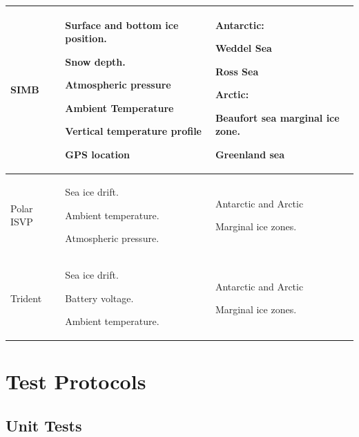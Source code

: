 \begin{center}
{\begin{longtable}[H]{|>{\RaggedRight}m{}|>{\RaggedRight}m{}|>{\RaggedRight}m{}|}
    SIMB    & Surface and bottom ice position. \par Snow depth. \par Atmospheric pressure \par Ambient Temperature \par Vertical temperature profile \par  GPS location & Antarctic: \par Weddel Sea \cite{hoppmann2015fmot} \par Ross Sea \cite{ackley_2020_seaice} \par \vspace{1.5mm}Arctic: \par Beaufort sea marginal ice zone. \par Greenland sea \cite{lei2018seasonal}\\
    \hline
    Polar ISVP &Sea ice drift.\par Ambient temperature. \par Atmospheric pressure. & Antarctic and Arctic \par Marginal ice zones.\\
    \hline
    Trident &Sea ice drift. \par Battery voltage. \par  Ambient temperature. & Antarctic and Arctic \par Marginal ice zones.\\
    \hline
    \end{longtable}
}
\end{center}

\chapter{Test Protocols}

\section{Unit Tests}


